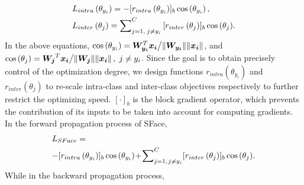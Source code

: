 \documentclass[journal,comsoc]{IEEEtran}
\begin{document}
\begin{equation}
\label{equ:sface}
\begin{gathered}
L_{intra}\left( {{\theta _{{y_i}}}} \right)=- {[{r_{intra}}\left( {{\theta _{{y_i}}}} \right)]_{b}}\cos \left( {{\theta _{{y_i}}}} \right),\hfill \\
L_{inter}\left( {{\theta _j}} \right)=\sum\nolimits_{j = 1,\;j \ne {y_i}}^C {{[{r_{inter}}\left( {{\theta _j}} \right)]_b}\cos \left( {{\theta _j}} \right)}.
\end{gathered}
\end{equation}In the above equations, $\cos \left( {{\theta _{{y_i}}}} \right) = {{\bm{W_{{y_i}}}^T\bm{x_i}} \mathord{\left/
		{\vphantom {{\bm{W_{{y_i}}}^T\bm{x_i}} {\left\| {\bm{W_{{y_i}}}} \right\|\left\| {\bm{x_i}} \right\|}}} \right.
		\kern-\nulldelimiterspace} {\left\| {\bm{W_{{y_i}}}} \right\|\!\left\| {\bm{x_i}} \right\|}}$, and ${{\cos \left( {{\theta _j}} \right) = \bm{{W_j}}^T\bm{{x_i}}} \mathord{\left/
		{\vphantom {{\cos \left( {{\theta _j}} \right) = {W_j}^T{x_i}} {\left\| {{W_j}} \right\|}}} \right.
		\kern-\nulldelimiterspace} {\left\| {{\bm{W_j}}} \right\|}}\!\left\| {{\bm{x_i}}} \right\|, {\;}j \ne {y_i}$. Since the goal is to obtain precisely control of the optimization degree, we design functions ${r_{intra}}\left( {{\theta _{{y_i}}}} \right)$ and ${r_{inter}}\left( {{\theta _j}} \right)$ to re-scale intra-class and inter-class objectives respectively to further restrict the optimizing speed. ${[\cdot]_b}$ is the block gradient operator, which prevents the contribution of its inputs to be taken into account for computing gradients. In the forward propagation process of SFace, 
\begin{equation}\label{equ:sface_forward}\begin{gathered}L_{SFace}=\hfill \\
-[{{r_{intra}}\left( {{\theta _{{y_i}}}} \right)]_b}\cos \left( {{\theta _{{y_i}}}}\right)\!+\!\sum\nolimits_{j = 1,\!\;j \ne {y_i}}^C \!{{[{r_{inter}}\left( {{\theta _j}} \right)]_b}\cos \left( {{\theta _j}}\right)}.\end{gathered}\end{equation}While in the backward propagation process,
\end{document}
